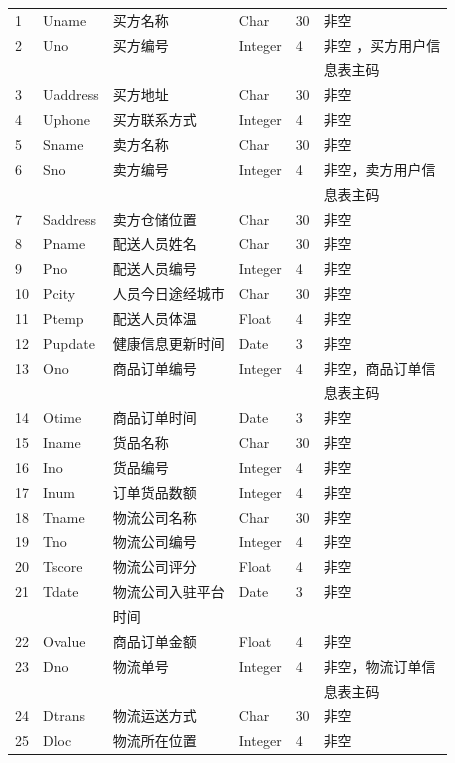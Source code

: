 \documentclass[12pt]{article}
\begin{document}
\begin{center}
\begin{supertabular}{llllll}
	1 &	Uname &	买方名称 &	Char &	30 &	非空 \\
	2 &	Uno &	买方编号 &	Integer & 4 &	非空 ，买方用户信  \\ &&&&& 息表主码\\
	3 &	Uaddress &	买方地址 &	Char &	30 &	非空 \\
	4 &	Uphone &	买方联系方式 &	Integer &	4 &	非空 \\
	5 &	Sname &	卖方名称 &	Char &	30 	& 非空\\
	6 &	Sno &	卖方编号 &	Integer &	4 	& 非空，卖方用户信 \\ &&&&& 息表主码 \\
	7 &	Saddress &	卖方仓储位置 &	Char &	30 	& 非空 \\
	8 &	Pname &	配送人员姓名 &	Char &	30 &	非空 \\
	9 &	Pno &	配送人员编号 &	Integer &	4 &	非空 \\
	10 &	Pcity &	人员今日途经城市 &	Char &	30 & 非空 \\
	11  &	Ptemp &	配送人员体温 &	Float &	4 &	非空 \\
	12 &	Pupdate &	健康信息更新时间 &	Date &	3 &	非空 \\
	13 &	Ono &	商品订单编号 &	Integer &	4 &	非空，商品订单信 \\ &&&&& 息表主码\\
	14 &	Otime &	商品订单时间 &	Date &	3 &	非空 \\
	15 &	Iname 	& 货品名称 &	Char &	30 &	非空 \\
	16 &	Ino &	货品编号 &	Integer &	4 &	非空 \\
	17 &	Inum &	订单货品数额 &	Integer &	4 &	非空 \\
	18 &	Tname &	物流公司名称 &	Char &	30 	& 非空 \\
	19 &	Tno &	物流公司编号 &	 Integer &	4 &	非空 \\
	20 & Tscore & 物流公司评分 & Float &	4 &	非空 \\
	21 & Tdate & 物流公司入驻平台 & Date & 3 & 非空 \\ && 时间 &&& \\
	22 &	Ovalue 	& 商品订单金额 	& Float &	4 &	非空 \\
	23 & Dno &	物流单号 &	Integer &	4 &	非空，物流订单信 \\ &&&&& 息表主码 \\
	24 &	Dtrans &	物流运送方式 &	Char &	30 &	非空 \\
	25 &	Dloc &	物流所在位置 &	Integer &	4 &	非空 \\

\end{supertabular}
\end{center}
\end{document}
